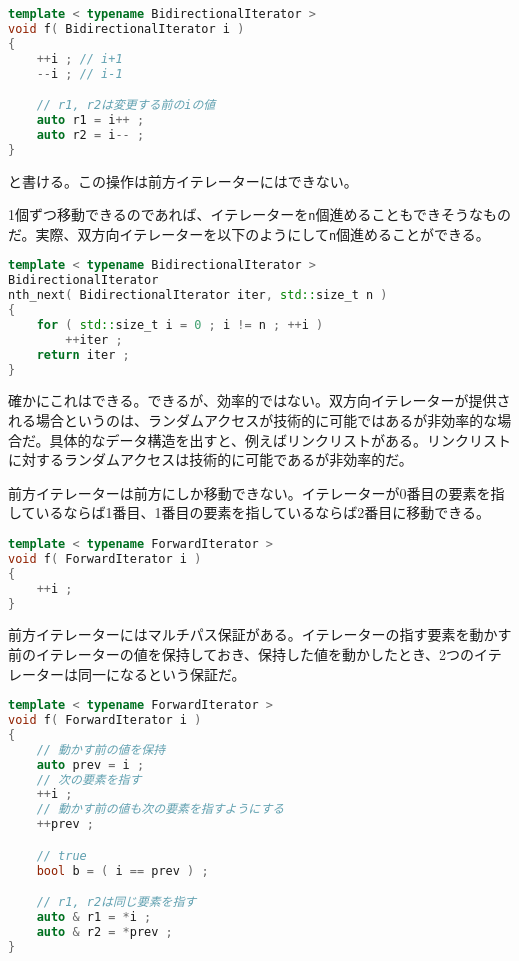 \begin{lstlisting}[language={C++}]
template < typename BidirectionalIterator >
void f( BidirectionalIterator i )
{
    ++i ; // i+1
    --i ; // i-1

    // r1, r2は変更する前のiの値
    auto r1 = i++ ;
    auto r2 = i-- ;
}
\end{lstlisting}
と書ける。この操作は前方イテレーターにはできない。

1個ずつ移動できるのであれば、イテレーターを\texttt{n}個進めることもできそうなものだ。実際、双方向イテレーターを以下のようにして\texttt{n}個進めることができる。

\begin{lstlisting}[language={C++}]
template < typename BidirectionalIterator >
BidirectionalIterator
nth_next( BidirectionalIterator iter, std::size_t n )
{
    for ( std::size_t i = 0 ; i != n ; ++i )
        ++iter ;
    return iter ;
}
\end{lstlisting}

確かにこれはできる。できるが、効率的ではない。双方向イテレーターが提供される場合というのは、ランダムアクセスが技術的に可能ではあるが非効率的な場合だ。具体的なデータ構造を出すと、例えばリンクリストがある。リンクリストに対するランダムアクセスは技術的に可能であるが非効率的だ。


前方イテレーターは前方にしか移動できない。イテレーターが0番目の要素を指しているならば1番目、1番目の要素を指しているならば2番目に移動できる。

\ifTombow\pagebreak\fi
\begin{lstlisting}[language={C++}]
template < typename ForwardIterator >
void f( ForwardIterator i )
{
    ++i ;
}
\end{lstlisting}

前方イテレーターにはマルチパス保証がある。イテレーターの指す要素を動かす前のイテレーターの値を保持しておき、保持した値を動かしたとき、2つのイテレーターは同一になるという保証だ。

\begin{lstlisting}[language={C++}]
template < typename ForwardIterator >
void f( ForwardIterator i )
{
    // 動かす前の値を保持
    auto prev = i ;
    // 次の要素を指す
    ++i ;
    // 動かす前の値も次の要素を指すようにする
    ++prev ;

    // true
    bool b = ( i == prev ) ;

    // r1, r2は同じ要素を指す
    auto & r1 = *i ;
    auto & r2 = *prev ;
}
\end{lstlisting}

